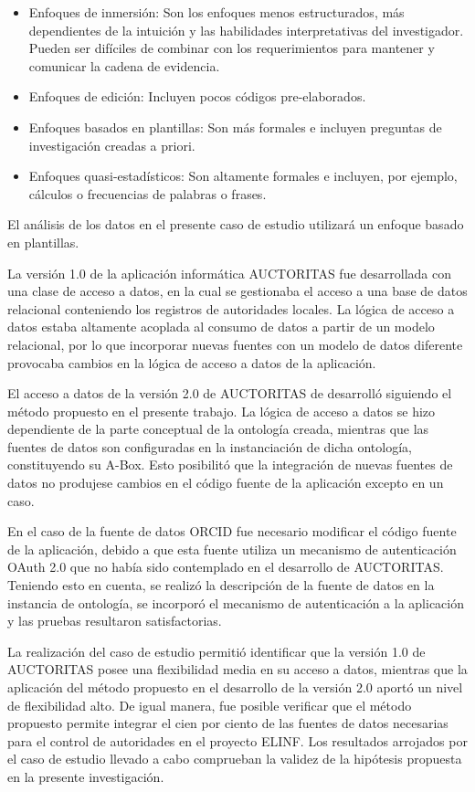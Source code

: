 \begin{itemize}
\item Enfoques de inmersión: Son los enfoques menos estructurados, más dependientes de la intuición y las habilidades interpretativas del investigador. Pueden ser difíciles de combinar con los requerimientos para mantener y comunicar la cadena de evidencia.
\item Enfoques de edición: Incluyen pocos códigos pre-elaborados.
\item Enfoques basados en plantillas: Son más formales e incluyen preguntas de investigación creadas a priori.
\item Enfoques quasi-estadísticos: Son altamente formales e incluyen, por ejemplo, cálculos o frecuencias de palabras o frases.
\end{itemize}

El análisis de los datos en el presente caso de estudio utilizará un enfoque basado en plantillas.

La versión 1.0 de la aplicación informática AUCTORITAS fue desarrollada con una clase de acceso a datos, en la cual se gestionaba el acceso a una base de datos relacional conteniendo los registros de autoridades locales. La lógica de acceso a datos estaba altamente acoplada al consumo de datos a partir de un modelo relacional, por lo que incorporar nuevas fuentes con un modelo de datos diferente provocaba cambios en la lógica de acceso a datos de la aplicación.

El acceso a datos de la versión 2.0 de AUCTORITAS de desarrolló siguiendo el método propuesto en el presente trabajo. La lógica de acceso a datos se hizo dependiente de la parte conceptual de la ontología creada, mientras que las fuentes de datos son configuradas en la instanciación de dicha ontología, constituyendo su A-Box. Esto posibilitó que la integración de nuevas fuentes de datos no produjese cambios en el código fuente de la aplicación excepto en un caso.

En el caso de la fuente de datos ORCID fue necesario modificar el código fuente de la aplicación, debido a que esta fuente utiliza un mecanismo de autenticación OAuth 2.0 que no había sido contemplado en el desarrollo de AUCTORITAS. Teniendo esto en cuenta, se realizó la descripción de la fuente de datos en la instancia de ontología, se incorporó el mecanismo de autenticación a la aplicación y las pruebas resultaron satisfactorias.

La realización del caso de estudio permitió identificar que la versión 1.0 de AUCTORITAS posee una flexibilidad media en su acceso a datos, mientras que la aplicación del método propuesto en el desarrollo de la versión 2.0 aportó un nivel de flexibilidad alto. De igual manera, fue posible verificar que el método propuesto permite integrar el cien por ciento de las fuentes de datos necesarias para el control de autoridades en el proyecto ELINF. Los resultados arrojados por el caso de estudio llevado a cabo comprueban la validez de la hipótesis propuesta en la presente investigación.

